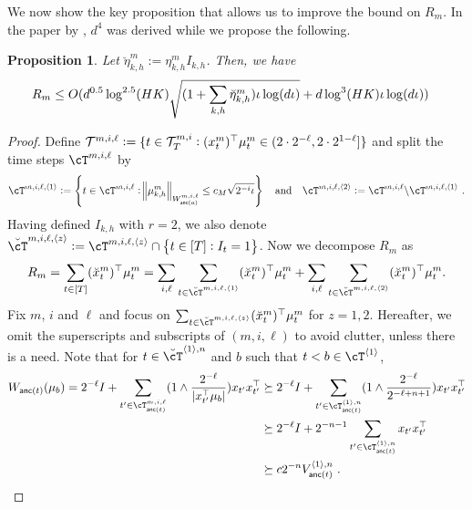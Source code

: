 \documentclass{article}
\newtheorem{proposition}{Proposition}
\def\brcT{\breve{\cT}}
\DeclareMathOperator{\anc}{\mathsf{anc}}
\def\brx{\breve{x}}
\def\la{{\langle}}
\def\ra{{\rangle}}
\newcommand{\blue}[1]{{\color[rgb]{.3,.5,1}#1}}
\renewcommand{\blue}[1]{#1}
\begin{document}
We now show the key proposition that allows us to improve the bound on $R_m$. In the paper by \citet{zhang21variance}, $d^4$ was derived while we propose the following.
\begin{proposition}\label{prop:rl-bound}
Let $\blue{\breve\eta_{k,h}^m} := \eta_{k,h}^m I_{k,h}$.
Then, we have
\begin{align*}
R_m&\le O(d^{0.5}\log^{2.5}(HK)\sqrt{(1+\sum_{k,h}\Breve \eta_{k,h}^m) \iota \log(d\iota )}+ d \log^3(HK)\iota \log(d\iota))
\end{align*} 
\end{proposition}
\begin{proof}
Define $\blue{\mathcal{T}^{m,i,\ell}}:=\{t\in \mathcal{T}_{T}^{m,i} : (x_{t}^m)^\T \mu_{t}^m \in (2\cd2^{-\ell},2\cd 2^{1-\ell}]\}$
and split the time steps $\cT^{m,i,\ell}$ by
\begin{align*}
  \blue{\cT^{m,i,\ell,\la1\ra}} := \cbr{t\in \cT^{m,i,\ell}: \norm{\mu^m_{k,h}}_{W^{m,i,\ell}_{\anc(a)}} \le c_M \sqrt{2^{-i} \iota} }
  \text{~~ and ~~} \blue{\cT^{m,i,\ell,\la2\ra}} := \cT^{m,i,\ell}  \sm \cT^{m,i,\ell,\la1\ra}~.
\end{align*}
Having defined $I_{k,h}$ with $r=2$, we also denote $\blue{\brcT^{m,i,\ell,\la z\ra}} := \cT^{m,i,\ell,\la z\ra} \cap \cbr{t\in[T]: I_{t} = 1}$.
Now we decompose $R_m$ as
\begin{align*}
    R_m = \sum_{t\in[T]}  (\brx_{t}^m)^\T \mu_{t}^m
   = \sum_{i,\ell} \sum_{t \in \brcT^{m,i,\ell,\la1\ra}}  (\brx_{t}^m)^\T \mu_{t}^m
  + \sum_{i,\ell} \sum_{t \in \brcT^{m,i,\ell,\la2\ra}} (\brx_{t}^m)^\T \mu_{t}^m.
\end{align*}
Fix $m$, $i$ and $\ell$ and focus on $\sum_{t \in \brcT^{m,i,\ell,\la z\ra}} (\brx_{t}^m)^\T \mu_{t}^m $ for $z=1,2$.
Hereafter, we omit the superscripts and subscripts of $(m,i,\ell)$ to avoid clutter, unless there is a need. 
Note that for $t  \in \brcT^{\la1\ra,n}$ and $b$ such that $t<b \in \cT^{\la1\ra}$, 
\begin{align*}
  W_{\anc(t)}(\mu_b)
  = 2^{-\ell} I +  \sum_{t' \in \cT^{m,i,\ell}_{\anc(t)}} (1\wedge \fr{2^{-\ell} }{|x_{t'}^\T \mu_b | } )   x_{t'} x_{t'}^\T
  &\succeq 2^{-\ell} I +  \sum_{t' \in \cT^{\la1\ra,n}_{\anc(t)}  } (1\wedge \fr{2^{-\ell} }{2^{-\ell+n+1} } )   x_{t'} x_{t'}^\T
  \\&\succeq 2^{-\ell} I +  2^{-n-1} \sum_{t' \in \cT^{\la1\ra,n}_{\anc(t)} } x_{t'} x_{t'}^\T
  \\&\succeq c2^{-n} V^{\la1\ra,n}_{\anc(t)}~.
\end{align*}


\end{proof}
\end{document}
